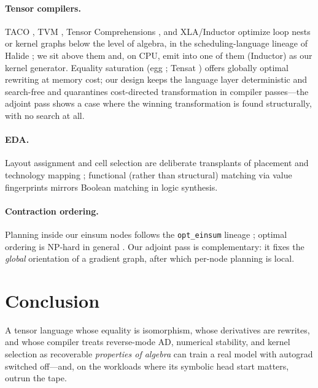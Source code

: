 \documentclass[sigplan,10pt,review]{acmart}
\begin{document}
\paragraph{Tensor compilers.} TACO \cite{taco}, TVM \cite{tvm}, Tensor Comprehensions
\cite{tensorcomprehensions}, and XLA/Inductor \cite{xla,pytorch2}
optimize loop nests or kernel graphs below the level of algebra, in the
scheduling-language lineage of Halide \cite{halide}; we sit above them and, on CPU, emit into one of them
(Inductor) as our kernel generator. Equality saturation \cite{eqsat} (egg \cite{egg}; Tensat \cite{tensat})
offers globally optimal rewriting at memory cost; our design keeps the
language layer deterministic and search-free and quarantines
cost-directed transformation in compiler passes---the adjoint pass shows
a case where the winning transformation is found structurally, with no
search at all.

\paragraph{EDA.} Layout assignment and cell selection are deliberate
transplants of placement and technology mapping \cite{dagon,abc}; functional (rather than
structural) matching via value fingerprints mirrors Boolean matching \cite{booleanmatching} in
logic synthesis.

\paragraph{Contraction ordering.} Planning inside our einsum nodes
follows the \texttt{opt\_einsum} lineage \cite{opteinsum,cotengra};
optimal ordering is NP-hard in general \cite{lam1997np}. Our adjoint
pass is complementary: it fixes the \emph{global} orientation of a
gradient graph, after which per-node planning is local.

\section{Conclusion}

A tensor language whose equality is isomorphism, whose derivatives are
rewrites, and whose compiler treats reverse-mode AD, numerical stability,
and kernel selection as recoverable \emph{properties of algebra} can
train a real model with autograd switched off---and, on the workloads
where its symbolic head start matters, outrun the tape.



\end{document}
